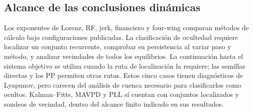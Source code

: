 \subsection{Alcance de las conclusiones dinámicas}

Los exponentes de Lorenz, RF, jerk, financiero y four-wing comparan métodos
de cálculo bajo configuraciones publicadas. La clasificación de ocultedad
requiere localizar un conjunto recurrente, comprobar su persistencia al
variar paso y método, y analizar vecindades de todos los equilibrios. La
continuación hasta el sistema objetivo se utiliza cuando la ruta de
localización la requiere; las semillas directas y los PP permiten otras
rutas. Estos cinco casos tienen diagnósticos de Lyapunov, pero carecen del
análisis de cuenca necesario para clasificarlos como ocultos. Kalman--Fitts,
MAVPD y PLL sí cuentan con conjuntos localizados y sondeos de vecindad,
dentro del alcance finito indicado en sus resultados.
